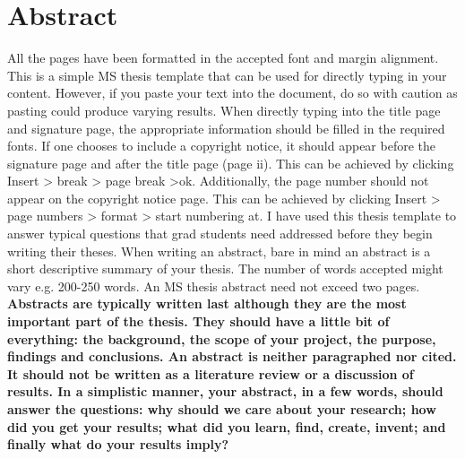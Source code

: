 \section*{Abstract} \label{sectionAbstract}


All the pages have been formatted in the accepted font and margin alignment. This is a simple MS thesis template that can be used for directly typing in your content. However, if you paste your text into the document, do so with caution as pasting could produce varying results. When directly typing into the title page and signature page, the appropriate information should be filled in the required fonts.  If one chooses to include a copyright notice, it should appear before the signature page and after the title page (page ii). This can be achieved by clicking Insert > break > page break >ok.  Additionally, the page number should not appear on the copyright notice page. This can be achieved by clicking Insert > page numbers > format > start numbering at. I have used this thesis template to answer typical questions that grad students need addressed before they begin writing their theses. When writing an abstract, bare in mind an abstract is a short descriptive summary of your thesis. The number of words accepted might vary e.g. 200-250 words. An MS thesis abstract need not exceed two pages. \textbf{Abstracts are typically written last although they are the most important part of the thesis. They should have a little bit of everything: the background, the scope of your project, the purpose, findings and conclusions. An abstract is neither paragraphed nor cited. It should not be written as a literature review or a discussion of results. In a simplistic manner, your abstract, in a few words, should answer the questions: why should we care about your research; how did you get your results; what did you learn, find, create, invent; and finally what do your results imply?}